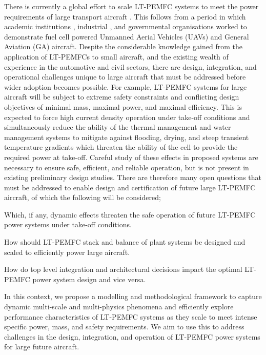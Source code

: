 There is currently a global effort to scale LT-PEMFC systems to meet the power requirements of large transport aircraft \cite{weeksZeroAviaReceivesFAA2025, retallackCommercialAircraftManufacturer2023, matousekNEWBORNNExtGeneration2023, woodScalabilityHydrogenFuel2024}.
This follows from a period in which academic institutions \cite{kalloFuelCellSystems2013}, industrial \cite{lapena-reyFirstFuelCellManned2010}, and governmental organisations \cite{noll2004investigation} worked to demonstrate fuel cell powered Unmanned Aerial Vehicles (UAVs) and General Aviation (GA) aircraft.
Despite the considerable knowledge gained from the application of LT-PEMFCs to small aircraft, and the existing wealth of experience in the automotive and civil sectors, there are  design, integration, and operational challenges unique to large aircraft that must be addressed before wider adoption becomes possible.
For example, LT-PEMFC systems for large aircraft will be subject to extreme safety constraints and conflicting design objectives of minimal mass, maximal power, and maximal efficiency. This is expected to force high current density operation under take-off conditions and simultaneously reduce the ability of the thermal management and water management systems to mitigate against flooding, drying, and steep transient temperature gradients which threaten the ability of the cell to provide the required power at take-off.
Careful study of these effects in proposed systems are necessary to ensure safe, efficient, and reliable operation, but is not present in existing preliminary design studies.
There are therefore many open questions that must be addressed to enable design and certification of future large LT-PEMFC aircraft, of which the following will be considered; \begin{enumerate*}
	\item Which, if any, dynamic effects threaten the safe operation of future LT-PEMFC power systems under take-off conditions.
	\item How should LT-PEMFC stack and balance of plant systems be designed and scaled to efficiently power large aircraft.
	\item How do top level integration and architectural decisions impact the optimal LT-PEMFC power system design and vice versa.
\end{enumerate*}

In this context, we propose a modelling and methodological framework to capture dynamic multi-scale and multi-physics phenomena and efficiently explore performance characteristics of LT-PEMFC systems as they scale to meet intense specific power, mass, and safety requirements.
We aim to use this to address challenges in the design, integration, and operation of LT-PEMFC power systems for large future aircraft.

